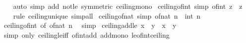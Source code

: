 \begin{isabellebody}
%
\isadelimproof
\ \ %
\endisadelimproof
%
\isatagproof
{}\isamarkupfalse%
\ {\isacharparenleft}{\kern0pt}auto\ simp\ add{\isacharcolon}{\kern0pt}\ not{\isacharunderscore}{\kern0pt}le\ {\isacharbrackleft}{\kern0pt}symmetric{\isacharbrackright}{\kern0pt}\ ceiling{\isacharunderscore}{\kern0pt}mono{\isacharparenright}{\kern0pt}%
\endisatagproof
{\isafoldproof}%
%
\isadelimproof
\isanewline
%
\endisadelimproof
\isanewline
{}\isamarkupfalse%
\ ceiling{\isacharunderscore}{\kern0pt}of{\isacharunderscore}{\kern0pt}int\ {\isacharbrackleft}{\kern0pt}simp{\isacharbrackright}{\kern0pt}{\isacharcolon}{\kern0pt}\ {\isachardoublequoteopen}{\isasymlceil}of{\isacharunderscore}{\kern0pt}int\ z{\isasymrceil}\ {\isacharequal}{\kern0pt}\ z{\isachardoublequoteclose}\isanewline
%
\isadelimproof
\ \ %
\endisadelimproof
%
\isatagproof
{}\isamarkupfalse%
\ {\isacharparenleft}{\kern0pt}rule\ ceiling{\isacharunderscore}{\kern0pt}unique{\isacharparenright}{\kern0pt}\ simp{\isacharunderscore}{\kern0pt}all%
\endisatagproof
{\isafoldproof}%
%
\isadelimproof
\isanewline
%
\endisadelimproof
\isanewline
{}\isamarkupfalse%
\ ceiling{\isacharunderscore}{\kern0pt}of{\isacharunderscore}{\kern0pt}nat\ {\isacharbrackleft}{\kern0pt}simp{\isacharbrackright}{\kern0pt}{\isacharcolon}{\kern0pt}\ {\isachardoublequoteopen}{\isasymlceil}of{\isacharunderscore}{\kern0pt}nat\ n{\isasymrceil}\ {\isacharequal}{\kern0pt}\ int\ n{\isachardoublequoteclose}\isanewline
%
\isadelimproof
\ \ %
\endisadelimproof
%
\isatagproof
{}\isamarkupfalse%
\ ceiling{\isacharunderscore}{\kern0pt}of{\isacharunderscore}{\kern0pt}int\ {\isacharbrackleft}{\kern0pt}of\ {\isachardoublequoteopen}of{\isacharunderscore}{\kern0pt}nat\ n{\isachardoublequoteclose}{\isacharbrackright}{\kern0pt}\ \isamarkupfalse%
\ simp%
\endisatagproof
{\isafoldproof}%
%
\isadelimproof
\isanewline
%
\endisadelimproof
\isanewline
{}\isamarkupfalse%
\ ceiling{\isacharunderscore}{\kern0pt}add{\isacharunderscore}{\kern0pt}le{\isacharcolon}{\kern0pt}\ {\isachardoublequoteopen}{\isasymlceil}x\ {\isacharplus}{\kern0pt}\ y{\isasymrceil}\ {\isasymle}\ {\isasymlceil}x{\isasymrceil}\ {\isacharplus}{\kern0pt}\ {\isasymlceil}y{\isasymrceil}{\isachardoublequoteclose}\isanewline
%
\isadelimproof
\ \ %
\endisadelimproof
%
\isatagproof
{}\isamarkupfalse%
\ {\isacharparenleft}{\kern0pt}simp\ only{\isacharcolon}{\kern0pt}\ ceiling{\isacharunderscore}{\kern0pt}le{\isacharunderscore}{\kern0pt}iff\ of{\isacharunderscore}{\kern0pt}int{\isacharunderscore}{\kern0pt}add\ add{\isacharunderscore}{\kern0pt}mono\ le{\isacharunderscore}{\kern0pt}of{\isacharunderscore}{\kern0pt}int{\isacharunderscore}{\kern0pt}ceiling{\isacharparenright}{\kern0pt}%

\end{isabellebody}
